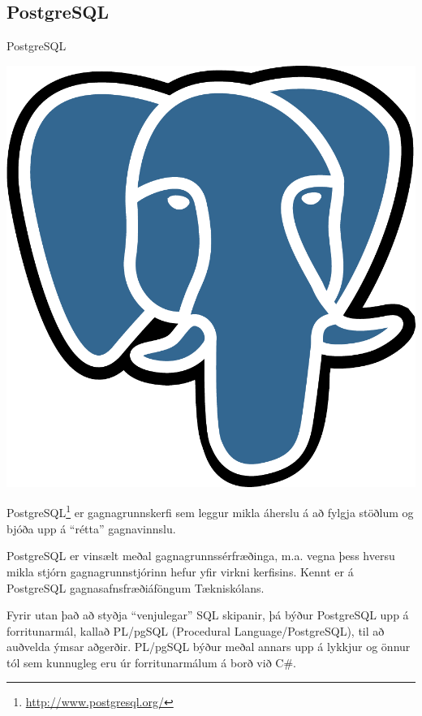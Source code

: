 \subsection{PostgreSQL}
\begin{marginfigure}
\caption{PostgreSQL}
\label{mynd:postgresql}
\centering
\includegraphics[width=0.8\linewidth]{myndir/postgresql}
\end{marginfigure}
PostgreSQL\footnote{\url{http://www.postgresql.org/}} er gagnagrunnskerfi sem leggur mikla áherslu á að fylgja stöðlum og bjóða upp á ``rétta'' gagnavinnslu.

PostgreSQL er vinsælt meðal gagnagrunnssérfræðinga, m.a. vegna þess hversu mikla stjórn gagnagrunnstjórinn hefur yfir virkni kerfisins. Kennt er á PostgreSQL gagnasafnsfræðiáföngum Tækniskólans.

Fyrir utan það að styðja ``venjulegar'' SQL skipanir, þá býður PostgreSQL upp á forritunarmál, kallað PL/pgSQL (Procedural Language/PostgreSQL), til að auðvelda ýmsar aðgerðir. PL/pgSQL býður meðal annars upp á lykkjur og önnur tól sem kunnugleg eru úr forritunarmálum á borð við C\#.
